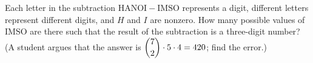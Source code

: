 Each letter in the subtraction $\mathrm{HANOI}-\mathrm{IMSO}$ represents a digit, different letters represent different digits, and $H$ and $I$ are nonzero. How many possible values of $\mathrm{IMSO}$ are there such that the result of the subtraction is a three-digit number? (A student argues that the answer is $\dbinom72\cdot5\cdot4=420$; find the error.)
